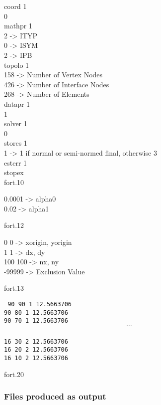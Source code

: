 \begin{exfile}[H]
coord 1\\
0\\
mathpr 1\\
2  -> ITYP\\
0  -> ISYM\\
2  -> IPB\\
topolo 1\\
 158 -> Number of Vertex Nodes\\
 426 -> Number of Interface Nodes\\
 268 -> Number of Elements\\
datapr 1\\
1\\
solver 1\\
0\\
stores 1\\
1  -> 1 if normal or semi-normed final, otherwise 3\\
esterr 1\\
stopex\\
\caption{fort.10}
\end{exfile}
	  
	  
\begin{exfile}[H]
0.0001  -> alpha0\\
0.02  -> alpha1
\caption{fort.12}
\end{exfile}

\begin{exfile}[H]
0  0  -> xorigin, yorigin\\
1  1  -> dx, dy\\
100  100  -> nx, ny\\
-99999  -> Exclusion Value
\caption{fort.13}
\end{exfile}

\begin{exfile}[H]
\tt
90 90 1 12.5663706\\
90 80 1 12.5663706\\
90 70 1 12.5663706\\
$$\cdots$$\\
16 30 2 12.5663706\\
16 20 2 12.5663706\\
16 10 2 12.5663706
\caption{fort.20}
\end{exfile}
	  
  
	  
	  
\subsubsection{Files produced as output}

